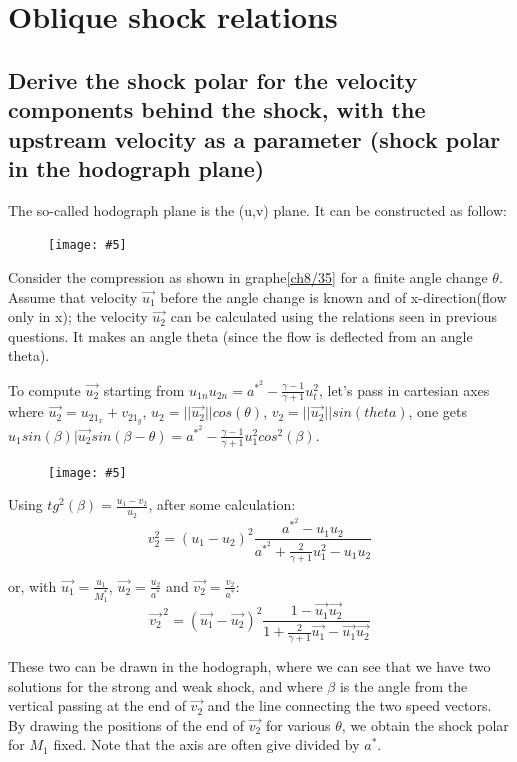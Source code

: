 \documentclass[british,french,11pt, a4paper, openany]{article}
\newcommand{\wrapfig}[6]{%
	\begin{figure}%
		\vspace{-5mm}%
		\texttt{[image: \#5]}%
		\captionof{figure}{}%
		\label{#6}%
	\end{figure}%
}
\begin{document}
\section{Oblique shock relations}
\subsection{Derive the shock polar for the velocity components behind the shock, with the upstream velocity as a parameter (shock polar in the hodograph plane)}
The so-called hodograph plane is the (u,v) plane. It can be constructed as follow:\\
\wrapfig{8}{l}{5}{0.15}{ch8/35}{ch8/35}	
Consider the compression as shown in graphe\autoref{ch8/35} for a finite angle change $\theta$. Assume that velocity $\vec{u_1}$ before the angle change is known and of x-direction(flow only in x); the velocity $\vec{u_2}$ can be calculated using the relations seen in previous questions. It makes an angle theta (since the flow is deflected from an angle theta).

To compute $\vec{u_2}$ starting from $u_{1n}u_{2n}=a^{*^{2}}-\frac{\gamma-1}{\gamma+1}u_{t}^{2}$, let's pass in cartesian axes where $\vec{u_2}=u_21_x+v_21_y$, $u_2=||\vec{u_2}||cos(\theta)$, $v_2=||\vec{u_2}||sin(theta)$, one gets $u_1 sin(\beta)|\vec{u_2}sin(\beta-\theta)=a^{*^2}-\frac{\gamma-1}{\gamma +1}u_{1}^{2}cos^2(\beta)$.

\wrapfig{15}{r}{8}{0.30}{ch8/42}{ch8/42}

Using $tg^2(\beta)=\frac{u_1-v_2}{u_2}$, after some calculation:
\begin{equation}
	v_2^2=(u_1-u_2)^2\frac{a^{*^{2}}-u_1u_2}{a^{*^{2}}+\frac{2}{\gamma+1}u_1^2-u_1u_2}
\end{equation}

or, with $\vec{u_1}=\frac{u_1}{M_1^*}$, $\vec{u_2}=\frac{u_2}{a^*}$ and $\vec{v_2}=\frac{v_2}{a^*}$:
\begin{equation}
	\vec{v_2}^{\,2}=(\vec{u_1}-\vec{u_2})^2\frac{1-\vec{u_1}\vec{u_2}}{1+\frac{2}{\gamma +1}\vec{u_1}-\vec{u_1}\vec{u_2}}
\end{equation}


These two can be drawn in the hodograph, where we can see that we have two solutions for the strong and weak shock, and where $\beta$ is the angle from the vertical passing at the end of $\vec{v_2}$ and the line connecting the two speed vectors. By drawing the positions of the end of $\vec{v_2}$ for various $\theta$, we obtain the shock polar for $M_1$ fixed. Note that the axis are often give divided by $a^*$.
\end{document}
